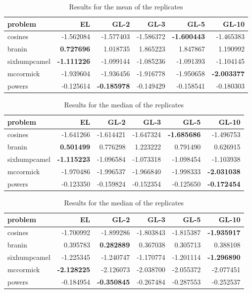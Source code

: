 \documentclass[twoside]{article}
\begin{document}
\begin{table*}
\begin{tabular}{lrrrrr}
\toprule
      problem &        EL &      GL-2 &      GL-3 &      GL-5 &     GL-10 \\
\midrule
      cosines & -1.562084 & -1.577403 & -1.586372 & \textbf{-1.600443} & -1.465383 \\
       branin &  \textbf{0.727696} &  1.018735 &  1.865223 &  1.847867 &  1.190992 \\
 sixhumpcamel & \textbf{-1.111226} & -1.099144 & -1.085236 & -1.091393 & -1.104145 \\
    mccormick & -1.939604 & -1.936456 & -1.916778 & -1.950658 & \textbf{-2.003377} \\
       powers & -0.125614 & \textbf{-0.185978} & -0.149429 & -0.158541 & -0.180303 \\
\bottomrule
\end{tabular}\caption{Results for the mean of the replicates}
\end{table*}

\begin{table*}
\begin{tabular}{lrrrrr}
\toprule
      problem &        EL &      GL-2 &      GL-3 &      GL-5 &     GL-10 \\
\midrule
      cosines & -1.641266 & -1.614421 & -1.647324 & \textbf{-1.685686} & -1.496753 \\
       branin &  \textbf{0.501499} &  0.776298 &  1.223222 &  0.791490 &  0.626915 \\
 sixhumpcamel & \textbf{-1.115223} & -1.096584 & -1.073318 & -1.098454 & -1.103938 \\
    mccormick & -1.970486 & -1.996537 & -1.966840 & -1.998333 & \textbf{-2.031038} \\
       powers & -0.123350 & -0.159824 & -0.152354 & -0.125650 & \textbf{-0.172454} \\
\bottomrule
\end{tabular}\caption{Results for the median of the replicates}
\end{table*}

\begin{table*}
\begin{tabular}{lrrrrr}
\toprule
      problem &        EL &      GL-2 &      GL-3 &      GL-5 &     GL-10 \\
\midrule
      cosines & -1.700992 & -1.899286 & -1.803843 & -1.815387 & \textbf{-1.935917} \\
       branin &  0.395783 &  \textbf{0.282889} &  0.367038 &  0.305713 &  0.388108 \\
 sixhumpcamel & -1.225345 & -1.240747 & -1.170774 & -1.201114 & \textbf{-1.296890} \\
    mccormick & \textbf{-2.128225} & -2.126073 & -2.038700 & -2.055372 & -2.077451 \\
       powers & -0.184954 & \textbf{-0.350845} & -0.267484 & -0.287553 & -0.252537 \\
\bottomrule
\end{tabular}\caption{Results for the median of the replicates}
\end{table*}
\end{document}
